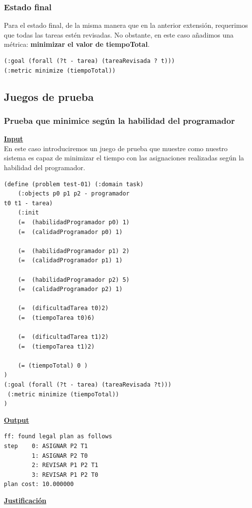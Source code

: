 \documentclass[11pt]{article}
\begin{document}
\subsubsection{Estado final}
Para el estado final, de la misma manera que en la anterior extensión, requerimos que todas las tareas estén revisadas. No obstante, en este caso añadimos una métrica: \textbf{minimizar el valor de tiempoTotal}.
\begin{verbatim}
(:goal (forall (?t - tarea) (tareaRevisada ? t))) 
(:metric minimize (tiempoTotal))
\end{verbatim}

\subsection{Juegos de prueba}
\subsubsection{Prueba que minimice según la habilidad del programador} 
\underline{\textbf{Input}}
\\

En este caso introduciremos un juego de prueba que muestre como nuestro sistema es capaz de minimizar el tiempo con las asignaciones realizadas según la habilidad del programador. 
\begin{verbatim}
(define (problem test-01) (:domain task) 
	(:objects p0 p1 p2 - programador
t0 t1 - tarea)
	(:init
	(=  (habilidadProgramador p0) 1)
	(=  (calidadProgramador p0) 1)

	(=  (habilidadProgramador p1) 2)
	(=  (calidadProgramador p1) 1)

	(=  (habilidadProgramador p2) 5)
	(=  (calidadProgramador p2) 1)

	(=  (dificultadTarea t0)2)
	(=  (tiempoTarea t0)6)

	(=  (dificultadTarea t1)2)
	(=  (tiempoTarea t1)2)

	(= (tiempoTotal) 0 )
)
(:goal (forall (?t - tarea) (tareaRevisada ?t)))
 (:metric minimize (tiempoTotal))
)

\end{verbatim}

\noindent \underline{\textbf{Output}}
\\

\begin{verbatim}
ff: found legal plan as follows
step    0: ASIGNAR P2 T1
        1: ASIGNAR P2 T0
        2: REVISAR P1 P2 T1
        3: REVISAR P1 P2 T0
plan cost: 10.000000
\end{verbatim}
\noindent \underline{{\textbf{Justificación}}}
\\
\end{document}
